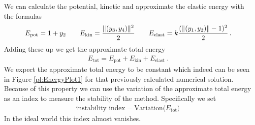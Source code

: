 \documentclass{report}
\DeclarePairedDelimiter{\norm}{\lVert}{\rVert}
\newcounter{constant}
\begin{document}
We can calculate the potential, kinetic and approximate the elastic energy with the formulas
\begin{align*}
	E_{\text{pot}}=1+y_2
	\qquad E_{\text{kin}}=\frac{\norm{(y_3,y_4)}^2}{2}
	\qquad E_{\text{elast}}=k\frac{(\norm{(y_1,y_2)}-1)^2}{2}\,.
\end{align*}
Adding these up we get the approximate total energy
\begin{align*}
	E_{\text{tot}}=E_{\text{pot}}+E_{\text{kin}}+E_{\text{elast}}\,.
\end{align*}
We expect the approximate total energy to be constant which indeed can be seen in Figure \ref{pl:EnergyPlot1} for that previously calculated numerical solution.
Because of this property we can use the variation of the approximate total energy as an index to measure the stability of the method. Specifically we set
\begin{align*}
	\text{instability index} = \text{Variation}\big(E_{\text{tot}}\big)
\end{align*}
In the ideal world this index almost vanishes.
\end{document}
